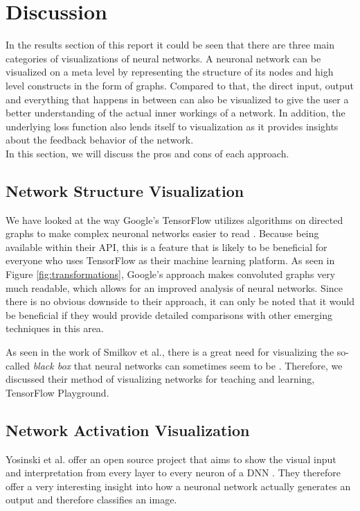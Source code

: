 \documentclass{acmsiggraph}               %
\begin{document}
\section{Discussion}
In the results section of this report it could be seen that there are three main categories of visualizations of neural networks. A neuronal network can be visualized on a meta level by representing the structure of its nodes and high level constructs in the form of graphs. Compared to that, the direct input, output and everything that happens in between can also be visualized to give the user a better understanding of the actual inner workings of a network. In addition, the underlying loss function also lends itself to visualization as it provides insights about the feedback behavior of the network.\\
In this section, we will discuss the pros and cons of each approach.\\

\subsection{Network Structure Visualization}

We have looked at the way Google's TensorFlow utilizes algorithms on directed graphs to make complex neuronal networks easier to read \cite{Wongsuphasawat2018}. Because being available within their API, this is a feature that is likely to be beneficial for everyone who uses TensorFlow as their machine learning platform. As seen in Figure \ref{fig:transformations}, Google's approach makes convoluted graphs very much readable, which allows for an improved analysis of neural networks. Since there is no obvious downside to their approach, it can only be noted that it would be beneficial if they would provide detailed comparisons with other emerging techniques in this area.

As seen in the work of Smilkov et al., there is a great need for visualizing the so-called \textit{black box} that neural networks can sometimes seem to be \cite{Smilkov2017}. Therefore, we discussed their method of visualizing networks for teaching and learning, TensorFlow Playground.

\subsection{Network Activation Visualization}

Yosinski et al. offer an open source project that aims to show the visual input and interpretation from every layer to every neuron of a DNN \cite{Yosinski2015}. They therefore offer a very interesting insight into how a neuronal network actually generates an output and therefore classifies an image.
\end{document}
